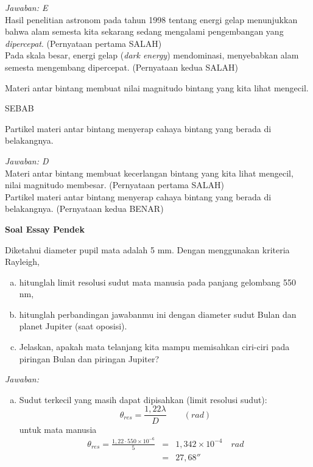 \documentclass[11pt,fleqn, a4paper]{exam}
\begin{document}
\begin{questions}
\textit{Jawaban: E}\\
Hasil penelitian astronom pada tahun 1998 tentang energi gelap menunjukkan bahwa alam semesta kita sekarang sedang mengalami pengembangan yang \textit{dipercepat}. (Pernyataan pertama SALAH)\\
Pada skala besar, energi gelap (\textit{dark energy}) mendominasi, menyebabkan alam semesta mengembang dipercepat. (Pernyataan kedua SALAH)

\vspace{0.5cm}
\question Materi antar bintang membuat nilai magnitudo bintang yang kita lihat mengecil.
\begin{center}
SEBAB
\end{center}
\noindent Partikel materi antar bintang menyerap cahaya bintang yang berada di belakangnya.

\textit{Jawaban: D}\\
Materi antar bintang membuat kecerlangan bintang yang kita lihat mengecil, nilai magnitudo membesar. (Pernyataan pertama SALAH)\\
Partikel materi antar bintang menyerap cahaya bintang yang berada di belakangnya. (Pernyataan kedua BENAR)


\vspace{1cm}
\textbf{Soal Essay Pendek}

\question Diketahui diameter pupil mata adalah 5 mm. Dengan menggunakan kriteria Rayleigh,
\begin{enumerate}[(a)]
\item hitunglah limit resolusi sudut mata manusia pada panjang gelombang 550 nm,
\item hitunglah perbandingan jawabanmu ini dengan diameter sudut Bulan dan planet Jupiter (saat oposisi).
\item Jelaskan, apakah mata telanjang kita mampu memisahkan ciri-ciri pada piringan Bulan dan piringan Jupiter?
\end{enumerate}

\textit{Jawaban:}
\begin{enumerate}[(a)]
\item Sudut terkecil yang masih dapat dipisahkan (limit resolusi sudut):
\begin{equation*}
\theta_{res} = \frac{1,22 \lambda}{D} \qquad (rad)
\end{equation*}
untuk mata manusia
\begin{eqnarray*}
\theta_{res} = \frac{1,22 \cdot 550 \times 10^{-6}}{5} &=& 1,342 \times 10^{-4} \quad rad\\
&=& 27,68''
\end{eqnarray*}


\end{enumerate}
\end{questions}
\end{document}
